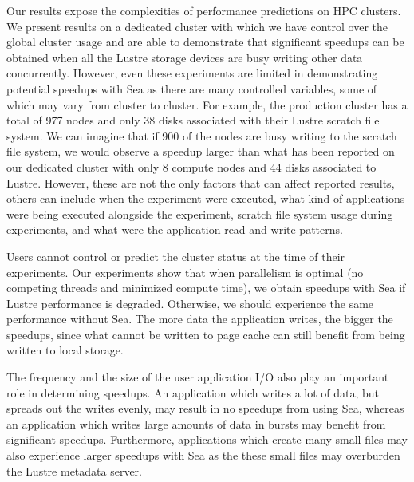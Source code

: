     Our results expose the complexities of performance predictions on HPC clusters. We present results on a dedicated cluster with which we have
    control over the global cluster usage and are able to demonstrate that
    significant speedups can be obtained when all the Lustre storage devices are
    busy writing other data concurrently. However, even these experiments are
    limited in demonstrating potential speedups with Sea as there are many
    controlled variables, some of which may vary from cluster to cluster. For
    example, the production cluster has a total of 977 nodes and only 38 disks associated with
    their Lustre scratch file system. We can imagine that if 900 of the nodes
    are busy writing to the scratch file system, we would observe a speedup
    larger than what has been reported on our dedicated cluster with only 8 compute
    nodes and 44 disks associated to Lustre. However, these are not the only
    factors that can affect reported results, others can include when the
    experiment were executed, what kind of applications were being executed
    alongside the experiment, scratch file system usage during experiments, and
    what were the application read and write patterns.

    Users cannot control or predict the cluster status at the time of their
    experiments.
    Our experiments show that when parallelism is optimal (no competing threads
    and minimized compute time), we obtain speedups with Sea if Lustre
    performance is degraded. Otherwise, we should experience the same
    performance without Sea. The more data the application writes, the bigger
    the speedups, since what cannot be written to page cache can still benefit from
    being written to local storage.
    
    The frequency and the size of the user application I/O also play an
    important role in determining speedups. An application which writes a lot of
    data, but spreads out the writes evenly, may result in no speedups from
    using Sea, whereas an application which writes large amounts of data in
    bursts may benefit from significant speedups. Furthermore, applications
    which create many small files may also experience larger speedups with Sea
    as the these small files may overburden the Lustre metadata server.

    
